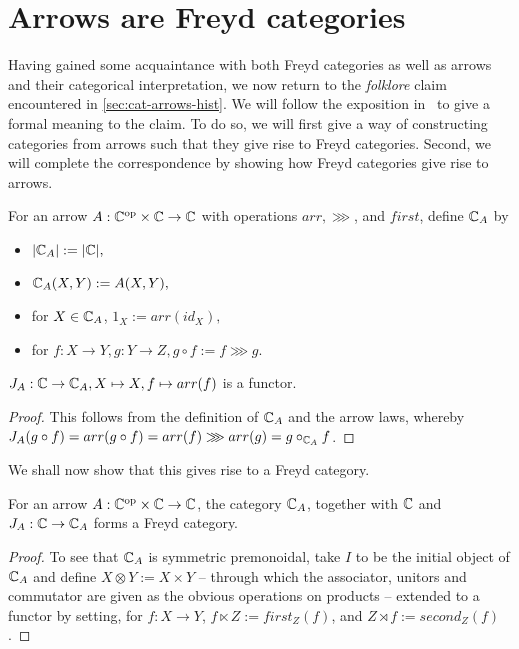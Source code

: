 \section{Arrows are Freyd categories}

Having gained some acquaintance with both Freyd categories as well as arrows and
their categorical interpretation, we now return to the \emph{folklore} claim
encountered in \ref{sec:cat-arrows-hist}. We will follow the exposition
in~\cite{cat-semantics-arr} to give a formal meaning to the claim. To do so, we
will first give a way of constructing categories from arrows such that they give
rise to Freyd categories. Second, we will complete the correspondence by showing
how Freyd categories give rise to arrows.

\begin{definition}
    For an arrow $A : {\mathbb{C}}^{\text{op}} \times \mathbb{C} \to \mathbb{C}$ with operations
    $arr, \ggg$, and $first$, define $\mathbb{C}_A$ by
    \begin{itemize}
        \item $|\mathbb{C}_A| := |\mathbb{C}|,$
        \item $\mathbb{C}_A(X, Y) := A(X, Y),$
        \item for $X \in \mathbb{C}_A$, $1_X := arr(id_X),$
        \item for $f: X \to Y, g: Y \to Z, g \circ f := f \ggg g.$
    \end{itemize}
\end{definition}

\begin{proposition}
    $J_A : \mathbb{C} \to \mathbb{C}_A, X \mapsto X, f \mapsto arr(f)$ is a functor.
\end{proposition}

\begin{proof}
    This follows from the definition of $\mathbb{C}_A$ and the arrow laws, whereby
    $J_A(g \circ f) = arr(g \circ f) = arr(f) \ggg arr(g) = g \circ_{\mathbb{C}_A}
    f$.
\end{proof}

We shall now show that this gives rise to a Freyd category.

\begin{lemma}
    For an arrow $A : {\mathbb{C}}^{\text{op}} \times \mathbb{C} \to \mathbb{C}$, the category
    $\mathbb{C}_A$, together with $\mathbb{C}$ and $J_A : \mathbb{C} \to \mathbb{C}_A$ forms a
    Freyd category.
\end{lemma}

\begin{proof}
    To see that $\mathbb{C}_A$ is symmetric premonoidal, take $I$ to be the initial
    object of $\mathbb{C}_A$ and define $X \otimes Y := X \times Y$ -- through which
    the associator, unitors and commutator are given as the obvious operations
    on products -- extended to a functor by setting, for $f: X \to Y$, $f
    \ltimes Z := first_Z(f)$, and $Z \rtimes f := second_Z(f)$.
\end{proof}
